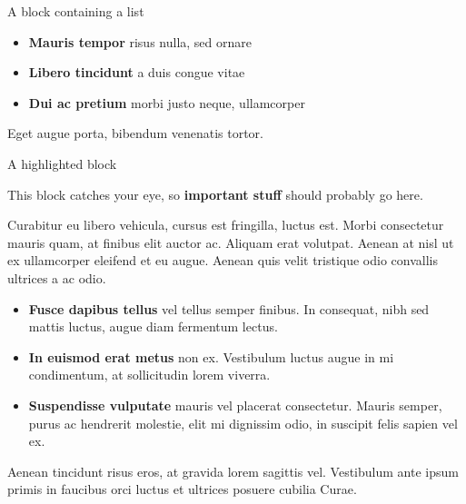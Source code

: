 \documentclass[final]{beamer}
\newlength{\colwidth}
\begin{document}
\begin{frame}[t]
\begin{columns}[t]
\begin{column}{\colwidth}
\begin{block}{A block containing a list}
                    \begin{itemize}
                        \item \textbf{Mauris tempor} risus nulla, sed ornare
                        \item \textbf{Libero tincidunt} a duis congue vitae
                        \item \textbf{Dui ac pretium} morbi justo neque, ullamcorper
                    \end{itemize}

                    Eget augue porta, bibendum venenatis tortor.

                \end{block}

                \begin{alertblock}{A highlighted block}

                    This block catches your eye, so \textbf{important stuff} should probably go
                    here.

                    Curabitur eu libero vehicula, cursus est fringilla, luctus est. Morbi
                    consectetur mauris quam, at finibus elit auctor ac. Aliquam erat volutpat.
                    Aenean at nisl ut ex ullamcorper eleifend et eu augue. Aenean quis velit
                    tristique odio convallis ultrices a ac odio.

                    \begin{itemize}
                        \item \textbf{Fusce dapibus tellus} vel tellus semper finibus. In
                        consequat, nibh sed mattis luctus, augue diam fermentum lectus.
                        \item \textbf{In euismod erat metus} non ex. Vestibulum luctus augue in
                        mi condimentum, at sollicitudin lorem viverra.
                        \item \textbf{Suspendisse vulputate} mauris vel placerat consectetur.
                        Mauris semper, purus ac hendrerit molestie, elit mi dignissim odio, in
                        suscipit felis sapien vel ex.
                    \end{itemize}

                    Aenean tincidunt risus eros, at gravida lorem sagittis vel. Vestibulum ante
                    ipsum primis in faucibus orci luctus et ultrices posuere cubilia Curae.

                \end{alertblock}


\end{column}
\end{columns}
\end{frame}
\end{document}
